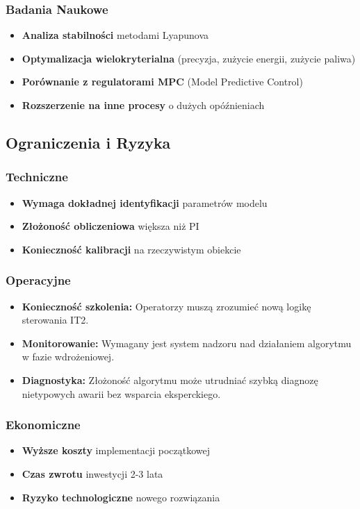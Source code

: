 \documentclass[12pt,a4paper]{article}
\begin{document}
\subsubsection{Badania Naukowe}
\begin{itemize}
    \item \textbf{Analiza stabilności} metodami Lyapunova
    \item \textbf{Optymalizacja wielokryterialna} (precyzja, zużycie energii, zużycie paliwa)
    \item \textbf{Porównanie z regulatorami MPC} (Model Predictive Control)
    \item \textbf{Rozszerzenie na inne procesy} o dużych opóźnieniach
\end{itemize}

\subsection{Ograniczenia i Ryzyka}

\subsubsection{Techniczne}
\begin{itemize}
    \item \textbf{Wymaga dokładnej identyfikacji} parametrów modelu
    \item \textbf{Złożoność obliczeniowa} większa niż PI
    \item \textbf{Konieczność kalibracji} na rzeczywistym obiekcie
\end{itemize}

\subsubsection{Operacyjne}
\begin{itemize}
    \item \textbf{Konieczność szkolenia:} Operatorzy muszą zrozumieć nową logikę sterowania IT2.
    \item \textbf{Monitorowanie:} Wymagany jest system nadzoru nad działaniem algorytmu w fazie wdrożeniowej.
    \item \textbf{Diagnostyka:} Złożoność algorytmu może utrudniać szybką diagnozę nietypowych awarii bez wsparcia eksperckiego.
\end{itemize}

\subsubsection{Ekonomiczne}
\begin{itemize}
    \item \textbf{Wyższe koszty} implementacji początkowej
    \item \textbf{Czas zwrotu} inwestycji 2-3 lata
    \item \textbf{Ryzyko technologiczne} nowego rozwiązania
\end{itemize}
\end{document}
